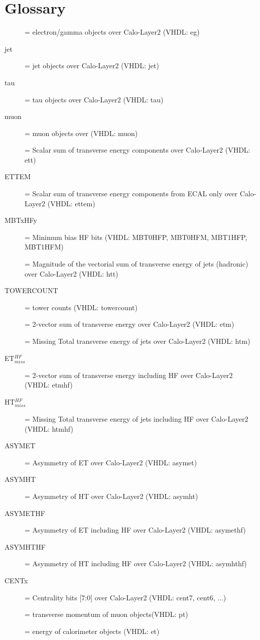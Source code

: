 \section{Glossary}\label{sec:glossary}

\begin{description}
\item [{\egamma}] = electron/gamma objects over Calo-Layer2 (VHDL: eg)
\item [{jet}] = jet objects over Calo-Layer2 (VHDL: jet)
\item [{tau}] = tau objects over Calo-Layer2 (VHDL: tau)
\item [{muon}] = muon objects over \ugmt (VHDL: muon)
\item [{\ett}] = Scalar sum of transverse energy components over Calo-Layer2 (VHDL: ett)
\item [{ETTEM}] = Scalar sum of transverse energy components from ECAL only over Calo-Layer2 (VHDL: ettem)
\item [{MBTxHFy}] = Minimum bias HF bits (VHDL: MBT0HFP, MBT0HFM, MBT1HFP, MBT1HFM)
\item [{\htt}] = Magnitude of the vectorial sum of transverse energy of jets (hadronic) over Calo-Layer2 (VHDL: htt)
\item [{TOWERCOUNT}] = tower counts (VHDL: towercount)
\item [{\etm}] = 2-vector sum of transverse energy over Calo-Layer2 (VHDL: etm)
\item [{\htm}] = Missing Total transverse energy of jets over Calo-Layer2 (VHDL: htm)
\item [{ET$_{miss}^{HF}$}] = 2-vector sum of transverse energy including HF over Calo-Layer2 (VHDL: etmhf)
\item [{HT$_{miss}^{HF}$}] = Missing Total transverse energy of jets including HF over Calo-Layer2 (VHDL: htmhf)
\item [{ASYMET}] = Asymmetry of ET over Calo-Layer2 (VHDL: asymet)
\item [{ASYMHT}] = Asymmetry of HT over Calo-Layer2 (VHDL: asymht)
\item [{ASYMETHF}] = Asymmetry of ET including HF over Calo-Layer2 (VHDL: asymethf)
\item [{ASYMHTHF}] = Asymmetry of HT including HF over Calo-Layer2 (VHDL: asymhthf)
\item [{CENTx}] = Centrality bits [7:0] over Calo-Layer2 (VHDL: cent7, cent6, ...)
\item [{\pt}] = transverse momentum of muon objects(VHDL: pt)
\item [{\et}] = energy of calorimeter objects (VHDL: et)

\end{description}
